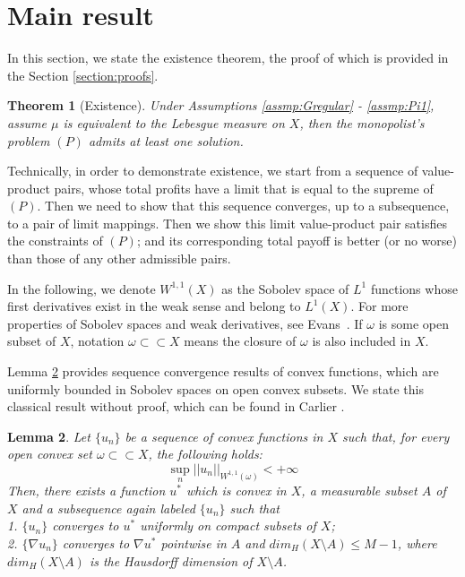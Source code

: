 \documentclass[a4paper, 11pt]{amsart}
\numberwithin{equation}{section}
\theoremstyle{plain}
\newtheorem{theorem}{Theorem}[section]
\newtheorem{lemma}[theorem]{Lemma}
\theoremstyle{definition}
\theoremstyle{remark}
\begin{document}
\section{Main result}\label{section:mainresult}
In this section, we state the existence theorem, the proof of which is provided in the Section \ref{section:proofs}. 


\begin{theorem}[Existence]
	Under Assumptions \ref{assmp:Gregular} - \ref{assmp:Pi1},  assume $\mu$ is equivalent to the Lebesgue measure on $X$, then the monopolist's problem $(P)$ admits at least one solution.
\end{theorem}

Technically, in order to demonstrate existence, we start from a sequence of value-product pairs, whose total profits have a limit that is equal to the supreme of $(P)$.
Then we need to show that this sequence converges, up to a subsequence, to a pair of limit mappings. Then we show this limit value-product pair satisfies the constraints of $(P)$; and its corresponding total payoff is better (or no worse) than those of any other admissible pairs. \medskip

In the following, we denote $W^{1,1}(X)$ as the Sobolev space of $L^1$ functions whose first derivatives exist in the weak sense and belong to $L^1(X)$. For more properties of Sobolev spaces and weak derivatives, see Evans~\cite[Chapter 5]{Evans98}. If $\omega$ is some open subset of $X$, notation $\omega \subset \subset X$ means the closure of $\omega$ is also included in $X$.\medskip

Lemma \ref{lemma1} provides sequence convergence results of convex functions, which are uniformly bounded in Sobolev spaces on open convex subsets. We state this classical result without proof, which can be found in Carlier \cite{Carlier01}.\medskip


\begin{lemma}\label{lemma1}
	Let $\{u_n\}$ be a sequence of convex functions in $X$ such that, for every open convex set $\omega \subset \subset X$, the following holds:
	\begin{equation*}
	\sup\limits_{n} ||u_n||_{W^{1,1}(\omega)} < +\infty
	\end{equation*}
	Then, there exists a function $u^*$ %
	which is convex in $X$, a measurable subset $A$ of $X$ and a subsequence again labeled $\{u_n\}$ such that\\
	1. $\{u_n\}$ converges to $u^*$ uniformly on compact subsets of $X$;\\
	2. $\{\nabla u_n\}$ converges to $\nabla u^*$ pointwise in $A$ and $dim_{H}(X\setminus A)\le M-1$, where $dim_{H}(X\setminus A)$ is the Hausdorff dimension of $X\setminus A$.
\end{lemma}
\end{document}
